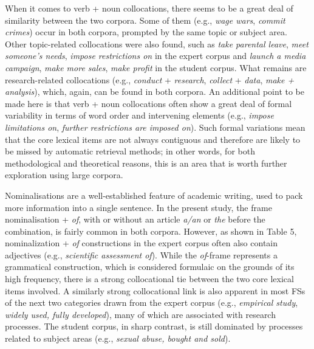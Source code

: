 \begin{styleStandard}
When it comes to verb + noun collocations, there seems to be a great deal of similarity between the two corpora. Some of them (e.g., \textit{wage wars}, \textit{commit crimes}) occur in both corpora, prompted by the same topic or subject area. Other topic-related collocations were also found, such as \textit{take parental leave}, \textit{meet someone’s needs}, \textit{impose restrictions on} in the expert corpus and \textit{launch a media campaign}, \textit{make more sales}, \textit{make profit} in the student corpus. What remains are research-related collocations (e.g., \textit{conduct} + \textit{research}, \textit{collect} + \textit{data}, \textit{make + analysis}), which, again, can be found in both corpora. An additional point to be made here is that verb + noun collocations often show a great deal of formal variability in terms of word order and intervening elements (e.g., \textit{impose limitations on}, \textit{further restrictions are imposed on}). Such formal variations mean that the core lexical items are not always contiguous and therefore are likely to be missed by automatic retrieval methods; in other words, for both methodological and theoretical reasons, this is an area that is worth further exploration using large corpora. 
\end{styleStandard}

\begin{styleStandard}
Nominalisations are a well-established feature of academic writing, used to pack more information into a single sentence. In the present study, the frame nominalisation + \textit{of}, with or without an article \textit{a/an} or \textit{the} before the combination, is fairly common in both corpora. However, as shown in Table 5, nominalization + \textit{of }constructions in the expert corpus often also contain adjectives (e.g., \textit{scientific assessment of}). While the \textit{of}{}-frame represents a grammatical construction, which is considered formulaic on the grounds of its high frequency, there is a strong collocational tie between the two core lexical items involved. A similarly strong collocational link is also apparent in most FSs of the next two categories drawn from the expert corpus (e.g., \textit{empirical study}, \textit{widely used, fully developed}), many of which are associated with research processes. The student corpus, in sharp contrast, is still dominated by processes related to subject areas (e.g., \textit{sexual abuse, bought and sold}). 
\end{styleStandard}

